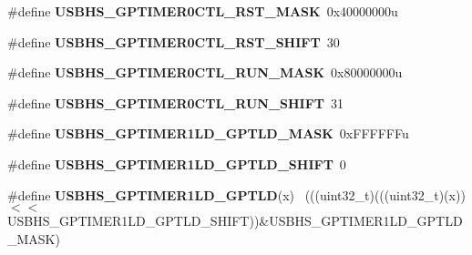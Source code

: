 \begin{DoxyCompactItemize}
\item 
\hypertarget{group___u_s_b_h_s___register___masks_ga9f6f0ea4e5d148e13471b3fe83e25252}{}\#define {\bfseries U\+S\+B\+H\+S\+\_\+\+G\+P\+T\+I\+M\+E\+R0\+C\+T\+L\+\_\+\+R\+S\+T\+\_\+\+M\+A\+S\+K}~0x40000000u\label{group___u_s_b_h_s___register___masks_ga9f6f0ea4e5d148e13471b3fe83e25252}

\item 
\hypertarget{group___u_s_b_h_s___register___masks_gaaf79d17763168be462fc5e5a901a9aca}{}\#define {\bfseries U\+S\+B\+H\+S\+\_\+\+G\+P\+T\+I\+M\+E\+R0\+C\+T\+L\+\_\+\+R\+S\+T\+\_\+\+S\+H\+I\+F\+T}~30\label{group___u_s_b_h_s___register___masks_gaaf79d17763168be462fc5e5a901a9aca}

\item 
\hypertarget{group___u_s_b_h_s___register___masks_ga01fbe58e13abd0c9f455b2a276dd4bcc}{}\#define {\bfseries U\+S\+B\+H\+S\+\_\+\+G\+P\+T\+I\+M\+E\+R0\+C\+T\+L\+\_\+\+R\+U\+N\+\_\+\+M\+A\+S\+K}~0x80000000u\label{group___u_s_b_h_s___register___masks_ga01fbe58e13abd0c9f455b2a276dd4bcc}

\item 
\hypertarget{group___u_s_b_h_s___register___masks_gaeb253f1f01a55fdc45a5389639fe70f3}{}\#define {\bfseries U\+S\+B\+H\+S\+\_\+\+G\+P\+T\+I\+M\+E\+R0\+C\+T\+L\+\_\+\+R\+U\+N\+\_\+\+S\+H\+I\+F\+T}~31\label{group___u_s_b_h_s___register___masks_gaeb253f1f01a55fdc45a5389639fe70f3}

\item 
\hypertarget{group___u_s_b_h_s___register___masks_ga98c4876ca451a1e3b5b95b2910cb1eb6}{}\#define {\bfseries U\+S\+B\+H\+S\+\_\+\+G\+P\+T\+I\+M\+E\+R1\+L\+D\+\_\+\+G\+P\+T\+L\+D\+\_\+\+M\+A\+S\+K}~0x\+F\+F\+F\+F\+F\+Fu\label{group___u_s_b_h_s___register___masks_ga98c4876ca451a1e3b5b95b2910cb1eb6}

\item 
\hypertarget{group___u_s_b_h_s___register___masks_gae9aa0e78aba76b9ecd49e9c8e04127d5}{}\#define {\bfseries U\+S\+B\+H\+S\+\_\+\+G\+P\+T\+I\+M\+E\+R1\+L\+D\+\_\+\+G\+P\+T\+L\+D\+\_\+\+S\+H\+I\+F\+T}~0\label{group___u_s_b_h_s___register___masks_gae9aa0e78aba76b9ecd49e9c8e04127d5}

\item 
\hypertarget{group___u_s_b_h_s___register___masks_gae8b979fce4f839ca43f83f7069b2e484}{}\#define {\bfseries U\+S\+B\+H\+S\+\_\+\+G\+P\+T\+I\+M\+E\+R1\+L\+D\+\_\+\+G\+P\+T\+L\+D}(x)                            ~(((uint32\+\_\+t)(((uint32\+\_\+t)(x))$<$$<$U\+S\+B\+H\+S\+\_\+\+G\+P\+T\+I\+M\+E\+R1\+L\+D\+\_\+\+G\+P\+T\+L\+D\+\_\+\+S\+H\+I\+F\+T))\&U\+S\+B\+H\+S\+\_\+\+G\+P\+T\+I\+M\+E\+R1\+L\+D\+\_\+\+G\+P\+T\+L\+D\+\_\+\+M\+A\+S\+K)\label{group___u_s_b_h_s___register___masks_gae8b979fce4f839ca43f83f7069b2e484}


\end{DoxyCompactItemize}
